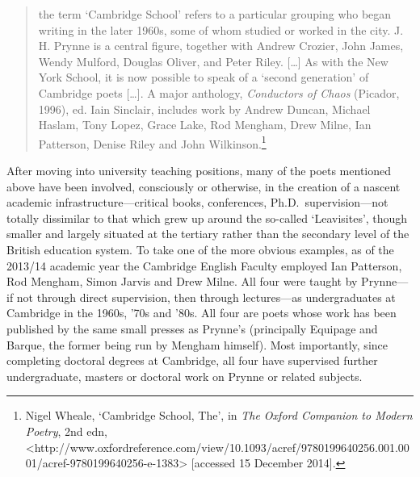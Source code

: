 \documentclass[]{article}
\begin{document}
\begin{quote}
the term `Cambridge School' refers to a particular grouping who began
writing in the later 1960s, some of whom studied or worked in the city.
J. H. Prynne is a central figure, together with Andrew Crozier, John
James, Wendy Mulford, Douglas Oliver, and Peter Riley. {[}\ldots{}{]} As
with the New York School, it is now possible to speak of a `second
generation' of Cambridge poets {[}\ldots{}{]}. A major anthology,
\emph{Conductors of Chaos} (Picador, 1996), ed. Iain Sinclair, includes
work by Andrew Duncan, Michael Haslam, Tony Lopez, Grace Lake, Rod
Mengham, Drew Milne, Ian Patterson, Denise Riley and John
Wilkinson.\footnote{Nigel Wheale, `Cambridge School, The', in \emph{The
  Oxford Companion to Modern Poetry}, 2nd edn,
  \textless{}http://www.oxfordreference.com/view/10.1093/acref/9780199640256.001.0001/acref-9780199640256-e-1383\textgreater{}
  {[}accessed 15 December 2014{]}.}
\end{quote}

\noindent After moving into university teaching positions, many of the
poets mentioned above have been involved, consciously or otherwise, in
the creation of a nascent academic infrastructure---critical books,
conferences, Ph.D.~supervision---not totally dissimilar to that which
grew up around the so-called `Leavisites', though smaller and largely
situated at the tertiary rather than the secondary level of the British
education system. To take one of the more obvious examples, as of the
2013/14 academic year the Cambridge English Faculty employed Ian
Patterson, Rod Mengham, Simon Jarvis and Drew Milne. All four were
taught by Prynne---if not through direct supervision, then through
lectures---as undergraduates at Cambridge in the 1960s, '70s and '80s.
All four are poets whose work has been published by the same small
presses as Prynne's (principally Equipage and Barque, the former being
run by Mengham himself). Most importantly, since completing doctoral
degrees at Cambridge, all four have supervised further undergraduate,
masters or doctoral work on Prynne or related subjects.
\end{document}

